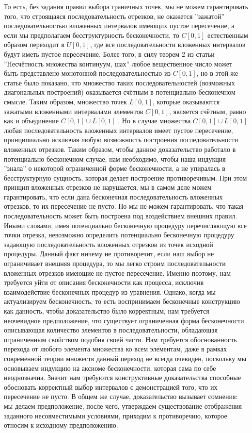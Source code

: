 \documentclass[12pt]{article}
\begin{document}
То есть, без задания правил выбора граничных точек, мы не можем гарантировать того, что строящаяся последовательность отрезков, не окажется ''зажатой'' последовательностью вложенных интервалов имеющих пустое пересечение, а если мы предполагаем бесструктурность бесконечности, то $C[0, 1]$ естественным образом переходит в $U[0, 1]$, где все последовательности вложенных интервалов будут иметь пустое пересечение. Более того, в силу теорем 2 из статьи ''Несчётность множества континуум, шах'' любое вещественное число может быть представлено монотонной последовательностью из $C[0, 1]$, но в этой же статье было показано, что множество таких последовательностей (возможных диагональных построений) оказывается счётным в потенциально бесконечном смысле. Таким образом, множество точек $L[0, 1]$, которые оказываются зажатыми вложенными интервалами элементов $C[0, 1]$, является счётным, равно как и объединение $C[0, 1] \cup L[0, 1]$ \cite{matan-countable-union}. Но в случае множества $C[0, 1] \cup L[0, 1]$ любая последовательность вложенных интервалов имеет пустое пересечение, принципиально исключая любую возможность построения последовательности вложенных отрезков. Таким образом, чтобы данное доказательство работало в потенциально бесконечном случае, нам необходимо, чтобы наша индукция ''знала'' о некоторой ограниченной форме бесконечности, а не упиралась в бесструктурную сущность, которая делает построение противоречивым. При этом принцип вложенных отрезков не нарушается, мы в самом деле можем гарантировать, что если дана бесконечная последовательность вложенных отрезков, то их пересечение не пусто. Но мы не можем гарантировать, что такая последовательность может быть построена под воздействием внешних правил. Иными словами, имея потенциально бесконечную процедуру перечисляющую все точки отрезка, невозможно определить потенциально бесконечную процедуру задающую последовательность вложенных отрезков из точек исходной процедуры. Данный факт ничему не противоречит, если наш выбор не ограничивает внешняя процедура, то мы легко строим последовательности вложенных отрезков имеющие не пустое пересечение. Именно поэтому, нам требуется уйти от описания бесконечности как процесса, исключив взаимодействие бесконечных процедур из уравнения. Однако, когда мы актуализируем бесконечность, то есть воспринимаем бесконечные конструкцию как данность, чтобы доказательство было корректным, нам требуется неочевидное предположение, что существует ограниченная форма бесконечности описывающая количество элементов в последовательности, обладающая ограниченным свойством подобия своей части. Нам требуется обоснованность перехода от любого элемента множества ко всем элементам, даже в рамках современной теории множеств данный переход не всегда очевиден, поскольку мы основываем индукцию на аксиоме бесконечности, которая сама по себе неоднозначна. Значит нам требуются конструктивные доказательства способные обосновать корректный выбор интервалов с демонстрацией того, что их пересечение не пусто. В общем же случае, доказательство вызывает сомнения: мы делаем предположение, после чего, утверждаем существование отображения заданного несовместимыми условиями, приходим к противоречию, которое относим к исходному предположению. 
\end{document}
